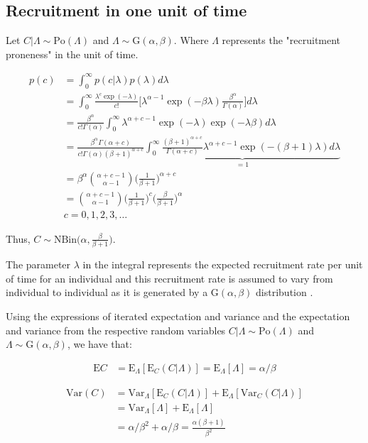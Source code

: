 \subsection{Recruitment in one unit of time}

Let $C|\Lambda \sim \textrm{Po}(\Lambda)$ and $\Lambda \sim \textrm{G}(\alpha,\beta)$. Where $\Lambda$ represents the "recruitment proneness" in the unit of time. 

\begin{align*}
p(c)&=\int^\infty_0 p(c|\lambda) p(\lambda) d\lambda\\
&=\int^\infty_0 \frac{\lambda^c\exp(-\lambda)}{c!}\Bigg[\lambda^{\alpha-1}\exp(-\beta\lambda)\frac{\beta^\alpha}{\Gamma(\alpha)}\Bigg]d\lambda\\
&=\frac{\beta^\alpha}{c!\Gamma(\alpha)}\int^\infty_0 \lambda^{\alpha+c-1}\exp(-\lambda)\exp(-\lambda\beta)d\lambda\\
&=\frac{\beta^\alpha\Gamma(\alpha+c)}{c!\Gamma(\alpha) (\beta+1)^{\alpha+c}}\underbrace{\int^\infty_0 \frac{(\beta+1)^{\alpha+c}}{\Gamma(\alpha+c)} \lambda^{\alpha+c-1}\exp(-(\beta+1)\lambda)d\lambda}_{=1}\\
&=\beta^\alpha\binom{\alpha+c-1}{\alpha-1}\Bigg (\frac{1}{\beta+1}\Bigg)^{\alpha+c}\\
&=\binom{\alpha+c-1}{\alpha-1}\Bigg (\frac{1}{\beta+1}\Bigg)^{c} \Bigg(\frac{\beta}{\beta+1}\Bigg)^{\alpha}\\
& c = 0,1,2,3,\ldots
\end{align*}

Thus, $C\sim \textrm{NBin} \Bigg(\alpha, \frac{\beta}{\beta+1}\Bigg)$.


The parameter $\lambda$ in the integral represents the expected recruitment rate per unit of time for an individual and this recruitment rate is assumed to vary from individual to individual as it is generated by a $\textrm{G}(\alpha,\beta)$ distribution \citep{johnson2005univariate}.


Using the expressions of iterated expectation and variance \citep{held2014applied} and the expectation and variance from the respective random variables $C|\Lambda \sim \textrm{Po}(\Lambda)$ and $\Lambda \sim \textrm{G}(\alpha,\beta)$, we have that:


\begin{align*}
\textrm{E}C &= \textrm{E}_{\Lambda}[\textrm{E}_{C} (C|\Lambda)] = \textrm{E}_{\Lambda}[\Lambda] = \alpha/\beta
\end{align*}

\begin{align*}
\textrm{Var}(C) &= \textrm{Var}_{\Lambda}[\textrm{E}_{C} (C|\Lambda)] + \textrm{E}_{\Lambda}[\textrm{Var}_C(C|\Lambda)]\\
&=\textrm{Var}_{\Lambda}[\Lambda] + \textrm{E}_{\Lambda}[\Lambda] \\
&=\alpha/\beta^2 + \alpha/\beta = \frac{\alpha(\beta+1)}{\beta^2}
\end{align*}


